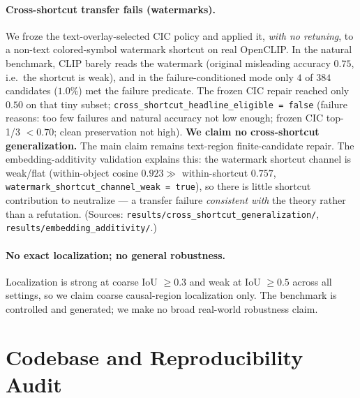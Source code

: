 \documentclass[11pt]{article}
\begin{document}
\paragraph{Cross-shortcut transfer fails (watermarks).}
We froze the text-overlay-selected CIC policy and applied it, \emph{with no
retuning}, to a non-text colored-symbol watermark shortcut on real OpenCLIP. In the
natural benchmark, CLIP barely reads the watermark (original misleading accuracy
$0.75$, i.e.\ the shortcut is weak), and in the failure-conditioned mode only $4$ of
$384$ candidates ($1.0\%$) met the failure predicate. The frozen CIC repair reached
only $0.50$ on that tiny subset; \texttt{cross\_shortcut\_headline\_eligible =
false} (failure reasons: too few failures and natural accuracy not low enough;
frozen CIC top-1/3 $<0.70$; clean preservation not high). \textbf{We claim no
cross-shortcut generalization.} The main claim remains text-region finite-candidate
repair. The embedding-additivity validation explains this: the watermark shortcut
channel is weak/flat (within-object cosine $0.923 \gg$ within-shortcut $0.757$,
\texttt{watermark\_shortcut\_channel\_weak = true}), so there is little shortcut
contribution to neutralize --- a transfer failure \emph{consistent with} the theory
rather than a refutation. (Sources:
\texttt{results/cross\_shortcut\_generalization/}, \texttt{results/embedding\_additivity/}.)

\paragraph{No exact localization; no general robustness.}
Localization is strong at coarse IoU $\ge 0.3$ and weak at IoU $\ge 0.5$ across all
settings, so we claim coarse causal-region localization only. The benchmark is
controlled and generated; we make no broad real-world robustness claim.

\section{Codebase and Reproducibility Audit}\label{sec:repro}
\end{document}
